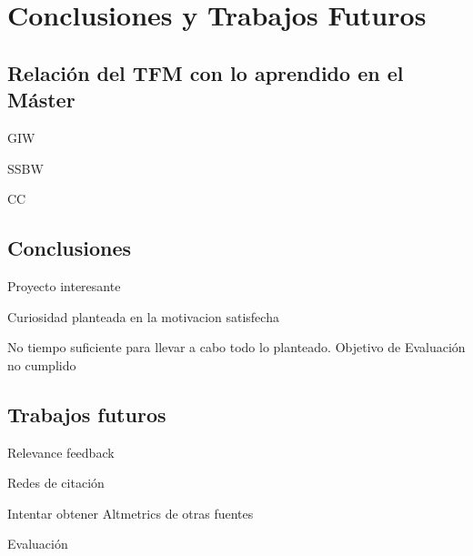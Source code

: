\chapter{Conclusiones y Trabajos Futuros}

\section{Relación del \acrshort{TFM} con lo aprendido en el Máster}

GIW

SSBW

CC


\section{Conclusiones}

Proyecto interesante

Curiosidad planteada en la motivacion satisfecha

No tiempo suficiente para llevar a cabo todo lo planteado. Objetivo de  Evaluación no cumplido

\section{Trabajos futuros}
Relevance feedback

Redes de citación

Intentar obtener Altmetrics de otras fuentes

Evaluación 